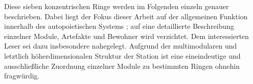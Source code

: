     Diese sieben konzentrischen Ringe werden im Folgenden einzeln genauer beschrieben. Dabei liegt der Fokus dieser Arbeit auf der allgemeinen Funktion innerhalb des autopoietischen Systems ; auf eine detaillierte Beschreibung einzelner Module, Artefakte und Bewohner wird verzichtet. Dem interessierten Leser sei dazu insbesondere \cite{cbasebook} nahegelegt. Aufgrund der multimodularen und letztlich höherdimensionalen Struktur der Station ist eine eineindeutige und ausschließliche Zuordnung einzelner Module zu bestimmten Ringen ohnehin fragwürdig.
    
